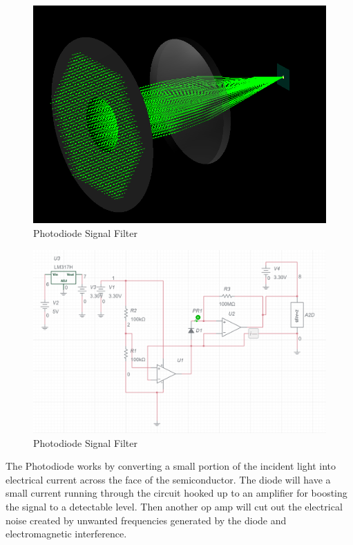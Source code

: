 \begin{figure}[H]
    \caption{Photodiode Signal Filter}
    \centering
    \includegraphics[width=\textwidth]{images/ColimatedBeam.png}
\end{figure}


\begin{figure}[H]
    \caption{Photodiode Signal Filter}
    \centering
    \includegraphics[width=\textwidth]{images/ElectricalSignalFilteringSD1.png}
\end{figure}


The Photodiode works by converting a small portion of the incident light into electrical current across the face of the semiconductor. The diode will have a small current running through the circuit hooked up to an amplifier for boosting the signal to a detectable level. Then another op amp will cut out the electrical noise created by unwanted frequencies generated by the diode and electromagnetic interference.

